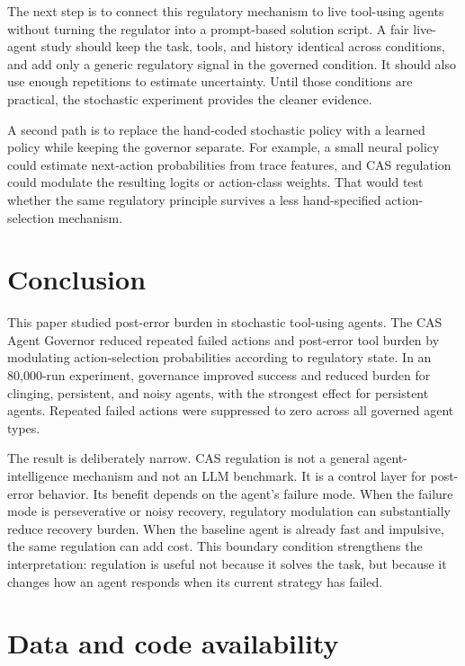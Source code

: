 \documentclass[11pt]{article}
\begin{document}
The next step is to connect this regulatory mechanism to live tool-using agents without turning the regulator into a prompt-based solution script. A fair live-agent study should keep the task, tools, and history identical across conditions, and add only a generic regulatory signal in the governed condition. It should also use enough repetitions to estimate uncertainty. Until those conditions are practical, the stochastic experiment provides the cleaner evidence.

A second path is to replace the hand-coded stochastic policy with a learned policy while keeping the governor separate. For example, a small neural policy could estimate next-action probabilities from trace features, and CAS regulation could modulate the resulting logits or action-class weights. That would test whether the same regulatory principle survives a less hand-specified action-selection mechanism.

\section{Conclusion}

This paper studied post-error burden in stochastic tool-using agents. The CAS Agent Governor reduced repeated failed actions and post-error tool burden by modulating action-selection probabilities according to regulatory state. In an 80,000-run experiment, governance improved success and reduced burden for clinging, persistent, and noisy agents, with the strongest effect for persistent agents. Repeated failed actions were suppressed to zero across all governed agent types.

The result is deliberately narrow. CAS regulation is not a general agent-intelligence mechanism and not an LLM benchmark. It is a control layer for post-error behavior. Its benefit depends on the agent's failure mode. When the failure mode is perseverative or noisy recovery, regulatory modulation can substantially reduce recovery burden. When the baseline agent is already fast and impulsive, the same regulation can add cost. This boundary condition strengthens the interpretation: regulation is useful not because it solves the task, but because it changes how an agent responds when its current strategy has failed.

\section*{Data and code availability}
\end{document}
